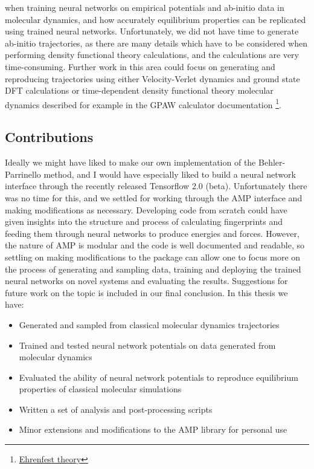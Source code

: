 when training neural networks on empirical potentials and ab-initio
data in molecular dynamics, and how accurately equilibrium properties
can be replicated using trained neural networks.
Unfortunately, we did not have time to generate ab-initio trajectories,
as there are many details which have to be considered when performing
density functional theory calculations, and the calculations are very
time-consuming. Further work in this area could focus on generating
and reproducing trajectories using either Velocity-Verlet dynamics
and ground state DFT calculations or time-dependent density functional
theory molecular dynamics described for example in the 
GPAW calculator documentation
\footnote{\href{https://wiki.fysik.dtu.dk/gpaw/documentation/ehrenfest/ehrenfest_theory
.html}{Ehrenfest theory}}.

\subsection{Contributions}
Ideally we might have liked to make our own implementation
of the Behler-Parrinello method,
and I would have especially liked to build a neural network interface
through the recently released Tensorflow 2.0 (beta). Unfortunately there
was no time for this, and we settled for working through the AMP interface
and making modifications as necessary.
Developing code from scratch could have given insights into the structure
and process of calculating fingerprints and feeding them through neural
networks to produce energies and forces. However, the nature of AMP
is modular and the code is well documented and readable, so 
settling on making modifications to the package can allow one to focus
more on the process of generating and sampling data, training and
deploying the trained neural networks on novel systems and evaluating the results.
Suggestions for future work on the topic
is included in our final conclusion.
In this thesis we have:

\begin{itemize}
    \item Generated and sampled from classical
        molecular dynamics trajectories
    \item Trained and tested neural network potentials
        on data generated from molecular dynamics
    \item Evaluated the ability of neural network potentials
        to reproduce equilibrium properties of classical
        molecular simulations
    \item Written a set of analysis and post-processing scripts
    \item Minor extensions and modifications to the AMP library
        for personal use
\end{itemize}

